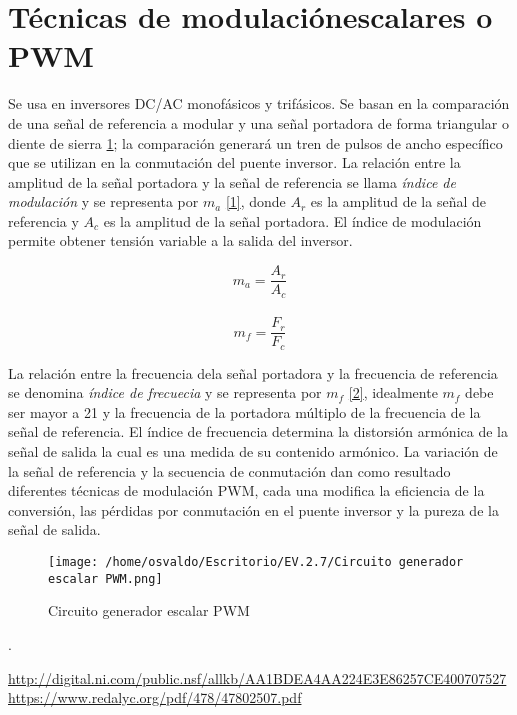 \documentclass[11pt]{article}
\begin{document}
\pagebreak
\section{T\'ecnicas de modulaci\'onescalares o PWM}

Se  usa  en  inversores  DC/AC monof\'asicos y trif\'asicos. Se basan en la comparaci\'on de una se\~nal de referencia  a  modular  y  una  se\~nal portadora  de  forma  triangular  o diente de sierra \ref{Figura 2}; la comparaci\'on generar\'a un tren de pulsos de ancho espec\'ifico que se utilizan en la conmutaci\'on del puente inversor. La relaci\'on entre la amplitud de la se\~nal portadora y la se\~nal de referencia se llama \textit{\'indice de modulaci\'on} y  se  representa  por  $m_a$ \ref{1},  donde  $A_r$ es la amplitud de la se\~nal de referencia y $A_c$ es la amplitud de la se\~nal portadora. El \'indice de modulaci\'on  permite  obtener tensi\'on variable a la salida del inversor.


\begin{equation}
m_a=\frac{A_r}{A_c}
\label{1}
\end{equation}\\

\begin{equation}
 m_f=\frac{F_r}{F_c}
\label{2}
 \end{equation}



La relaci\'on entre la frecuencia dela se\~nal portadora y la frecuencia de referencia  se  denomina  \textit {\'indice de frecuecia} y se representa por $m_f$ \ref{2}, idealmente $m_f$ debe ser mayor a 21  y  la  frecuencia  de  la  portadora m\'ultiplo de la frecuencia de la se\~nal de referencia. El \'indice de frecuencia determina la distorsi\'on arm\'onica de la se\~nal de salida la cual es una medida de su  contenido  arm\'onico. La variaci\'on de la se\~nal de referencia y la  secuencia  de  conmutaci\'on dan como  resultado  diferentes  t\'ecnicas de modulaci\'on PWM, cada una modifica la eficiencia de la conversi\'on,  las  p\'erdidas  por  conmutaci\'on en el puente inversor y la pureza de la se\~nal de salida.


\begin{figure}[htp]
\centering
\texttt{[image: /home/osvaldo/Escritorio/EV.2.7/Circuito generador escalar PWM.png]}
\caption{Circuito generador escalar PWM}
\label{Figura 2}
\end{figure}
.

\pagebreak
\begin{thebibliography}{0}
\textcolor{blue}{\url{http://digital.ni.com/public.nsf/allkb/AA1BDEA4AA224E3E86257CE400707527}}\\

\textcolor{blue}{\url{https://www.redalyc.org/pdf/478/47802507.pdf}}


 \end{thebibliography}
\end{document}
